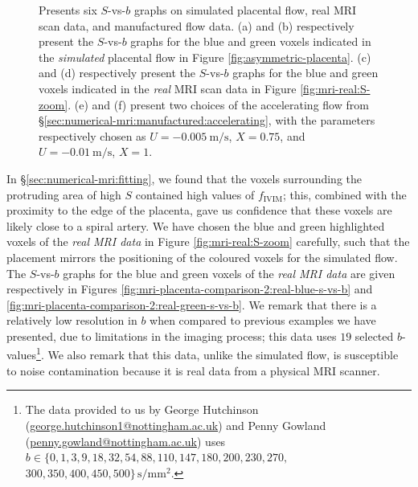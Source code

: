 \begin{figure}
\begin{centering}
\begin{subfigure}{0.45\textwidth}
\begin{centering}
                        \caption{}
                        \label{fig:mri-placenta-comparison-2:green-accel}
                    \end{centering}
                \end{subfigure}
            \end{centering}
            \caption{Presents six $S$-vs-$b$ graphs on simulated placental flow, real MRI scan data, and manufactured flow data. (a) and (b) respectively present the $S$-vs-$b$ graphs for the blue and green voxels indicated in the \textit{simulated} placental flow in Figure \ref{fig:asymmetric-placenta}. (c) and (d) respectively present the $S$-vs-$b$ graphs for the blue and green voxels indicated in the \textit{real} MRI scan data in Figure \ref{fig:mri-real:S-zoom}. (e) and (f) present two choices of the accelerating flow from \S\ref{sec:numerical-mri:manufactured:accelerating}, with the parameters respectively chosen as $U = \qty{-0.005}{\metre\per\second}$, $X = 0.75$, and $U = \qty{-0.01}{\metre\per\second}$, $X = 1$.}
            \label{fig:mri-placenta-comparison-2}
        \end{figure}

        In \S\ref{sec:numerical-mri:fitting}, we found that the voxels surrounding the protruding area of high $S$ contained high values of $f_\text{IVIM}$; this, combined with the proximity to the edge of the placenta, gave us confidence that these voxels are likely close to a spiral artery. We have chosen the blue and green highlighted voxels of the \textit{real MRI data} in Figure \ref{fig:mri-real:S-zoom} carefully, such that the placement mirrors the positioning of the coloured voxels for the simulated flow. The $S$-vs-$b$ graphs for the blue and green voxels of the \textit{real MRI data} are given respectively in Figures \ref{fig:mri-placenta-comparison-2:real-blue-s-vs-b} and \ref{fig:mri-placenta-comparison-2:real-green-s-vs-b}. We remark that there is a relatively low resolution in $b$ when compared to previous examples we have presented, due to limitations in the imaging process; this data uses $19$ selected $b$-values\footnote{The data provided to us by George Hutchinson (\href{mailto:george.hutchinson1@nottingham.ac.uk}{george.hutchinson1@nottingham.ac.uk}) and Penny Gowland (\href{mailto:penny.gowland@nottingham.ac.uk}{penny.gowland@nottingham.ac.uk}) uses $b \in \{ 0, 1, 3, 9, 18, 32, 54, 88, 110, 147, 180, 200, 230, 270,$\\$300, 350, 400, 450, 500 \}\,\unit{\second\per\milli\metre^2}$.}. We also remark that this data, unlike the simulated flow, is susceptible to noise contamination because it is real data from a physical MRI scanner.


